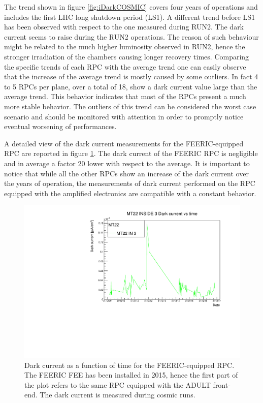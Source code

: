 The trend shown in figure \ref{fig:iDarkCOSMIC} covers four years of operations and includes the first LHC long shutdown period (LS1).
A different trend before LS1 has been observed with respect to the one measured during RUN2.
The dark current seems to raise during the RUN2 operations.
The reason of such behaviour might be related to the much higher luminosity observed in RUN2, hence the stronger irradiation of the chambers causing longer recovery times.
Comparing the specific trends of each RPC with the average trend one can easily observe that the increase of the average trend is mostly caused by some outliers.
In fact 4 to 5 RPCs per plane, over a total of 18, show a dark current value large than the average trend.
This behavior indicates that most of the RPCs present a much more stable behavior.
The outliers of this trend can be considered the worst case scenario and should be monitored with attention in order to promptly notice eventual worsening of performances.

A detailed view of the dark current measurements for the FEERIC-equipped RPC are reported in figure \ref{fig:FEERICiDark}.
The dark current of the FEERIC RPC is negligible and in average a factor $20$ lower with respect to the average.
It is important to notice that while all the other RPCs show an increase of the dark current over the years of operation, the measurements of dark current performed on the RPC equipped with the amplified electronics are compatible with a constant behavior.

\begin{figure}[!t]
\begin{center}
\includegraphics[width=0.95\linewidth]{Chapters/Performance/Figs/iDarkFEERIC.pdf}
\caption{Dark current as a function of time for the FEERIC-equipped RPC. The FEERIC FEE has been installed in 2015, hence the first part of the plot refers to the same RPC equipped with the ADULT front-end. The dark current is measured during cosmic runs.}
\label{fig:FEERICiDark}
\end{center}
\end{figure}

